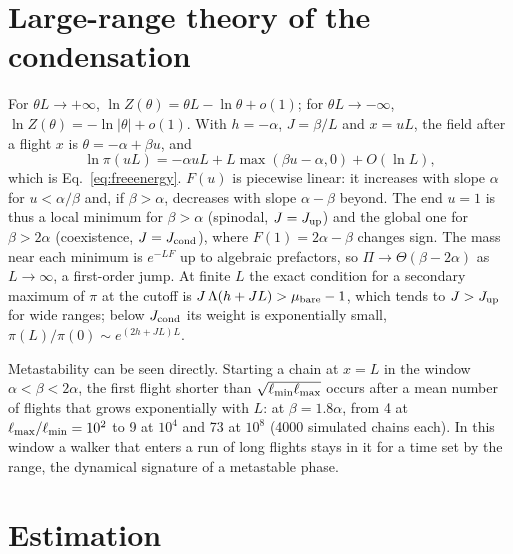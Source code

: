 \section{Large-range theory of the condensation}\label{app:largeL}

For $\theta L\to+\infty$, $\ln Z(\theta)=\theta L-\ln\theta+o(1)$; for $\theta L\to-\infty$, $\ln Z(\theta)=-\ln|\theta|+o(1)$. With $h=-\alpha$, $J=\beta/L$ and $x=uL$, the field after a flight $x$ is $\theta=-\alpha+\beta u$, and
\begin{equation}
\ln\pi(uL)=-\alpha uL+L\max(\beta u-\alpha,0)+O(\ln L),
\end{equation}
which is Eq.~\eqref{eq:freeenergy}. $F(u)$ is piecewise linear: it increases with slope $\alpha$ for $u<\alpha/\beta$ and, if $\beta>\alpha$, decreases with slope $\alpha-\beta$ beyond. The end $u=1$ is thus a local minimum for $\beta>\alpha$ (spinodal, $J=J_{\rm up}$) and the global one for $\beta>2\alpha$ (coexistence, $J=J_{\rm cond}$), where $F(1)=2\alpha-\beta$ changes sign. The mass near each minimum is $e^{-LF}$ up to algebraic prefactors, so $\Pi\to\Theta(\beta-2\alpha)$ as $L\to\infty$, a first-order jump. At finite $L$ the exact condition for a secondary maximum of $\pi$ at the cutoff is $J\,\Lambda(h+JL)>\mu_{\rm bare}-1$, which tends to $J>J_{\rm up}$ for wide ranges; below $J_{\rm cond}$ its weight is exponentially small, $\pi(L)/\pi(0)\sim e^{(2h+JL)L}$.

Metastability can be seen directly. Starting a chain at $x=L$ in the window $\alpha<\beta<2\alpha$, the first flight shorter than $\sqrt{\ell_{\min}\ell_{\max}}$ occurs after a mean number of flights that grows exponentially with $L$: at $\beta=1.8\alpha$, from 4 at $\ell_{\max}/\ell_{\min}=10^2$ to 9 at $10^4$ and 73 at $10^8$ (4000 simulated chains each). In this window a walker that enters a run of long flights stays in it for a time set by the range, the dynamical signature of a metastable phase.

\section{Estimation}\label{app:estimation}

